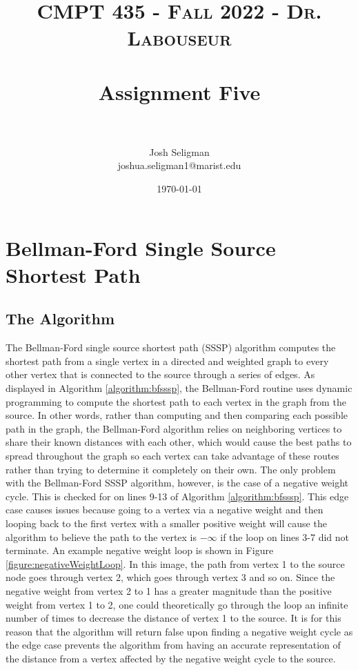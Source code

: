 \documentclass[letterpaper, 10pt,DIV=13]{scrartcl}
\title{	
   \normalfont \normalsize 
   \textsc{CMPT 435 - Fall 2022 - Dr. Labouseur} \\[10pt] %
   \horrule{0.5pt} \\[0.25cm] 	%
   \huge Assignment Five  \\     	    %
   \horrule{0.5pt} \\[0.25cm] 	%
}
\author{Josh Seligman \\ \normalsize joshua.seligman1@marist.edu}
\date{\normalsize\today} 	%
\numberwithin{equation}{section} %
\numberwithin{figure}{section} %
\numberwithin{table}{section} %
\begin{document}
\maketitle %

\section{Bellman-Ford Single Source Shortest Path}
\subsection{The Algorithm}
The Bellman-Ford single source shortest path (SSSP) algorithm computes the shortest path from a single vertex in a directed and weighted graph to every other vertex that is connected to the source through a series of edges. As displayed in Algorithm \ref{algorithm:bfsssp}, the Bellman-Ford routine uses dynamic programming to compute the shortest path to each vertex in the graph from the source. In other words, rather than computing and then comparing each possible path in the graph, the Bellman-Ford algorithm relies on neighboring vertices to share their known distances with each other, which would cause the best paths to spread throughout the graph so each vertex can take advantage of these routes rather than trying to determine it completely on their own. The only problem with the Bellman-Ford SSSP algorithm, however, is the case of a negative weight cycle. This is checked for on lines 9-13 of Algorithm \ref{algorithm:bfsssp}. This edge case causes issues because going to a vertex via a negative weight and then looping back to the first vertex with a smaller positive weight will cause the algorithm to believe the path to the vertex is $-\infty$ if the loop on lines 3-7 did not terminate. An example negative weight loop is shown in Figure \ref{figure:negativeWeightLoop}. In this image, the path from vertex 1 to the source node goes through vertex 2, which goes through vertex 3 and so on. Since the negative weight from vertex 2 to 1 has a greater magnitude than the positive weight from vertex 1 to 2, one could theoretically go through the loop an infinite number of times to decrease the distance of vertex 1 to the source. It is for this reason that the algorithm will return false upon finding a negative weight cycle as the edge case prevents the algorithm from having an accurate representation of the distance from a vertex affected by the negative weight cycle to the source.
\end{document}
